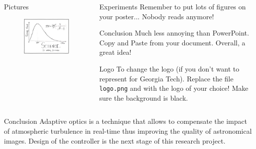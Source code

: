 \documentclass[final,hyperref={pdfpagelabels=false}]{beamer}
\begin{document}
\begin{frame}{}
\begin{columns}[t]
\begin{column}{0.32\linewidth}
      \begin{block}{Pictures}
        \begin{figure}[htb]
          \centering
          \includegraphics[width=1\columnwidth]{science}
        \end{figure}
      \end{block}

    \end{column}%

    \begin{column}{0.32\linewidth}

      \begin{block}{Experiments}
        Remember to put lots of figures on your poster... Nobody reads anymore!
      \end{block}

      \begin{block}{Conclusion}
        Much less annoying than PowerPoint.  Copy and Paste from your
        document. Overall, a great idea!
      \end{block}

      \begin{block}{Logo}
        To change the logo (if you don't want to represent for Georgia Tech).
        Replace the file {\tt logo.png} and with the logo of your choice!
        Make sure the background is black.
      \end{block}

    \end{column}%

  \end{columns}

	\begin{block}{Conclusion} \justifying
Adaptive optics is a technique that allows to compensate the impact of atmospheric turbulence in real-time thus improving the quality of astronomical images. Design of the controller is the next stage of this research project.
	\end{block}%

\end{frame}
\end{document}
